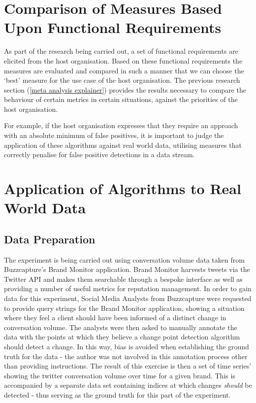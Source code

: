 \documentclass{uvamscse}	%
\begin{document}
\section{Comparison of Measures Based Upon Functional Requirements}

As part of the research being carried out, a set of functional requirements are elicited from the host organisation. Based on these functional requirements the measures are evaluated and compared in such a manner that we can choose the `best' measure for the use case of the host organisation. The previous research section (\autoref{meta analysis explainer}) provides the results necessary to compare the behaviour of certain metrics in certain situations, against the priorities of the host organisation.

For example, if the host organisation expresses that they require an approach with an absolute minimum of false positives, it is important to judge the application of these algorithms against real world data, utilising measures that correctly penalise for false positive detections in a data stream.

\section{Application of Algorithms to Real World Data}
\label{real world explainer}

\subsection{Data Preparation}

The experiment is being carried out using conversation volume data taken from Buzzcapture's Brand Monitor application. Brand Monitor harvests tweets via the Twitter API and makes them searchable through a bespoke interface as well as providing a number of useful metrics for reputation management. In order to gain data for this experiment, Social Media Analysts from Buzzcapture were requested to provide query strings for the Brand Monitor application, showing a situation where they feel a client should have been informed of a distinct change in conversation volume. The analysts were then asked to manually annotate the data with the points at which they believe a change point detection algorithm should detect a change. In this way, bias is avoided when establishing the ground truth for the data - the author was not involved in this annotation process other than providing instructions. The result of this exercise is then a set of time series' showing the twitter conversation volume over time for a given brand. This is accompanied by a separate data set containing indices at which changes \emph{should} be detected - thus serving as the ground truth for this part of the experiment.
\end{document}
